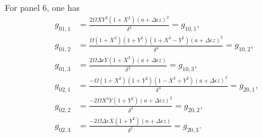 \documentclass{article}
\begin{document}
For panel $6$, one has
\begin{align}
g_{01,1}&=\frac{2\Omega XY^3(1+X^2)(a+\Delta \epsilon z)^2}{\delta^4}=g_{10,1}, \\
g_{01,2}&=\frac{\Omega (1+X^2)(1+Y^2)(1+X^2-Y^2)(a+\Delta \epsilon z)^2}{\delta^4}=g_{10,2}, \\
g_{01,3}&=\frac{2\Omega \Delta \epsilon Y(1+X^2)(a+\Delta \epsilon z)}{\delta^2}=g_{10,3}, \\
g_{02,1}&=\frac{-\Omega (1+X^2)(1+Y^2)(1-X^2+Y^2)(a+\Delta \epsilon z)^2}{\delta^4}=g_{20,1}, \\
g_{02,2}&=\frac{-2\Omega X^3Y(1+Y^2)(a+\Delta \epsilon z)^2}{\delta^4}=g_{20,2}, \\
g_{02,3}&=\frac{-2\Omega \Delta \epsilon X(1+Y^2)(a+\Delta \epsilon z)}{\delta^2}=g_{20,3}.
\end{align}
\end{document}

